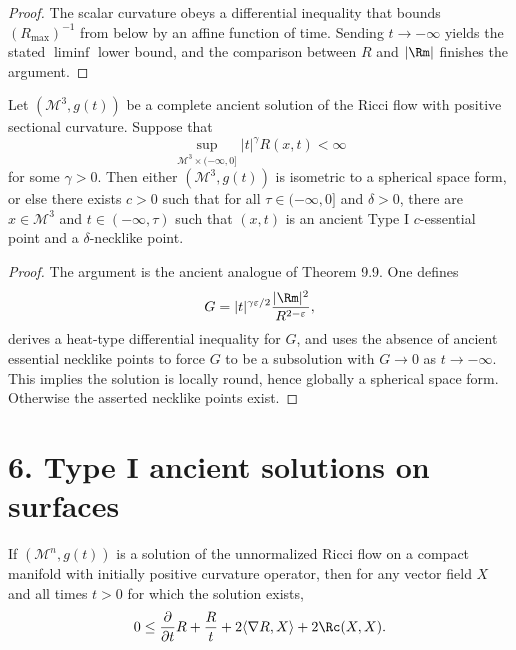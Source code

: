\begin{proof}
\sketch The scalar curvature obeys a differential inequality that bounds \((R_{\max})^{-1}\) from below by an affine function of time. Sending \(t\to-\infty\) yields the stated \(\liminf\) lower bound, and the comparison between \(R\) and \(|\Rm|\) finishes the argument.
\end{proof}

\begin{theorem}
\label{ch09-thm-necklike-points-ancient}

Let \((\mathcal M^3,g(t))\) be a complete ancient solution of the Ricci flow with positive sectional curvature. Suppose that
\[
\sup_{\mathcal M^3\times(-\infty,0]}|t|^\gamma R(x,t)<\infty
\]
for some \(\gamma>0\). Then either \((\mathcal M^3,g(t))\) is isometric to a spherical space form, or else there exists \(c>0\) such that for all \(\tau\in(-\infty,0]\) and \(\delta>0\), there are \(x\in\mathcal M^3\) and \(t\in(-\infty,\tau)\) such that \((x,t)\) is an ancient Type I \(c\)-essential point and a \(\delta\)-necklike point.
\end{theorem}

\begin{proof}
\sketch The argument is the ancient analogue of Theorem 9.9. One defines
\[
G=|t|^{\gamma\varepsilon/2}\frac{|\Rm|^2}{R^{2-\varepsilon}},
\]
derives a heat-type differential inequality for \(G\), and uses the absence of ancient essential necklike points to force \(G\) to be a subsolution with \(G\to 0\) as \(t\to-\infty\). This implies the solution is locally round, hence globally a spherical space form. Otherwise the asserted necklike points exist.
\end{proof}

\section*{6. Type I ancient solutions on surfaces}

\begin{proposition}
\label{ch09-prop-lyh-trace-estimate}

If \((\mathcal M^n,g(t))\) is a solution of the unnormalized Ricci flow on a compact manifold with initially positive curvature operator, then for any vector field \(X\) and all times \(t>0\) for which the solution exists,
\[
0 \le \frac{\partial}{\partial t}R + \frac{R}{t} + 2\langle \nabla R, X\rangle + 2\Rc(X,X).
\]
\end{proposition}

